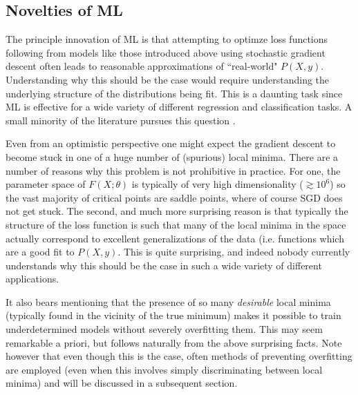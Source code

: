\documentclass{subfile}
\begin{document}
\subsection{Novelties of ML}
The principle innovation of ML is that attempting to optimze loss functions following from models like those introduced above using stochastic gradient descent
often leads to reasonable approximations of ``real-world" $P(X,y)$.  Understanding why this should be the case would require understanding the underlying
structure of the distributions being fit.  This is a daunting task since ML is effective for a wide variety of different regression and classification tasks.  A
small minority of the literature pursues this question \cite{renorm,deepcheap}.

Even from an optimistic perspective one might expect the gradient descent to become stuck in one of a huge number of (spurious) local minima.  There are a
number of reasons why this problem is not prohibitive in practice.  For one, the parameter space of $F(X;\theta)$ is typically of very high dimensionality
($\gtrsim 10^{6}$) so the vast majority of critical points are saddle points, where of course SGD does not get stuck.  The second, and much more surprising
reason is that typically the structure of the loss function is such that many of the local minima in the space actually correspond to excellent generalizations
of the data (i.e. functions which are a good fit to $P(X,y)$.  This is quite surprising, and indeed nobody currently understands why this should be the case in
such a wide variety of different applications.

It also bears mentioning that the presence of so many \emph{desirable} local minima (typically found in the vicinity of the true minimum) makes it possible to
train underdetermined models without severely overfitting them.  This may seem remarkable a priori, but follows naturally from the above surprising facts.  Note
however that even though this is the case, often methods of preventing overfitting are employed (even when this involves simply discriminating between local
minima) and will be discussed in a subsequent section.
\end{document}

